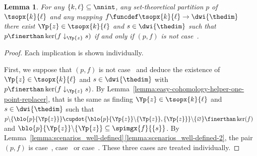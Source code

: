 \documentclass[pdftex]{sigma}
\numberwithin{equation}{section}
\newtheorem{Lemma}[Theorem]{Lemma}
\begin{document}
{
  \newcommand{\inlen}{k}
  \newcommand{\outlen}{\ell}
  \newcommand{\theind}{f}
  \newcommand{\theindx}[1]{f(#1)}
  \newcommand{\thepoint}{\Yp{z}}
  \newcommand{\thevalue}{s}
  \newcommand{\thepartition}{p}
  \newcommand{\thealtered}{\theind\downarrow_\thepoint\thevalue}
  \newcommand{\theblock}{\blo{\thepartition}{\thepoint}}
  \newcommand{\cutblock}{\blo{\thepartition}{\thepoint}\backslash \{\thepoint\}}
  \newcommand{\sing}{\{\thepoint\}}
  \newcommand{\thelong}{\Yb{Z}}
  \newcommand{\firstspecialpoint}{\Yp{z}_1}
  \newcommand{\secondspecialpoint}{\Yp{z}_2}
  \newcommand{\thegood}{f}
  \newcommand{\theonevalue}{s_1}
  \newcommand{\theothervalue}{s_2}
  \newcommand{\anypoint}{\Yp{y}}
  \newcommand{\someblock}{\Yb{A}}
  \newcommand{\anyblock}{\Yb{B}}
  \newcommand{\alternativefirstspecialpoint}{\Yp{z}_1'}
  \newcommand{\alternativesecondspecialpoint}{\Yp{z}_2'}
  \newcommand{\alternativelong}{\Yb{Z}'}
  \newcommand{\alternativepoint}{\Yp{z}'}
  \newcommand{\alternativevalue}{s'}
  \newcommand{\alternativeanypoint}{\Yp{y}'}
  \begin{Lemma}
    \label{lemma:easy-cohomology-helper-non-trivial-polynomials}
    For any ${\{\inlen,\outlen\}\subseteq \nnint}$, any set-theoretical partition $\thepartition$ of $\tsopx{\inlen}{\outlen}$ and any mapping $\theind\funcdef\tsopx{\inlen}{\outlen}\to \dwi{\thedim}$ there exist $\thepoint\in\tsopx{\inlen}{\outlen}$ and $\thevalue\in\dwi{\thedim}$ such that $\thepartition\finerthan\ker(\thealtered)$  if and only if $(\thepartition,\theind)$ is not case~\scenariofour.
\end{Lemma}
\begin{proof}
  Each implication is shown individually.

   First, we suppose that $(\thepartition,\theind)$ is not case~\scenariofour{}
  and deduce the existence of $\thepoint\in\tsopx{\inlen}{\outlen}$ and $\thevalue\in\dwi{\thedim}$ with $\thepartition\finerthan\ker(\thealtered)$. By Lem\-ma~\ref{lemma:easy-cohomology-helper-one-point-replacer}, that is the same as finding $\thepoint\in\tsopx{\inlen}{\outlen}$ and $\thevalue\in\dwi{\thedim}$ such that $\thepartition\backslash \{\theblock\}\cupdot \{\cutblock,\sing\}\backslash \{\varnothing\}\finerthan \ker(\theind)$ and $\cutblock\subseteq \spimgx{\theind}{\{\thevalue\}}$. By Lem\-ma~\hyperref[lemma:scenarios_well-defined-2]{\ref*{lemma:scenarios_well-defined}\,\ref*{lemma:scenarios_well-defined-2}}, the pair $(\thepartition,\theind)$ is case~\scenarioone{}, case~\scenariotwo{} or case~\scenariothree{}. These three cases are treated individually.


\end{proof}}
\end{document}
